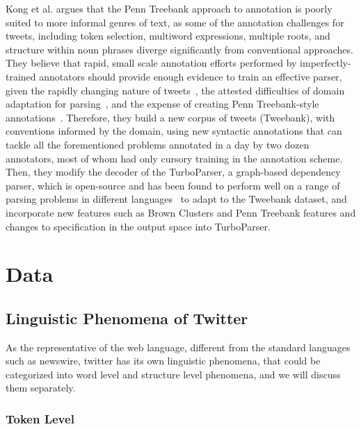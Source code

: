 \documentclass[11pt,letterpaper]{article}
\begin{document}
Kong et al.  argues that the Penn Treebank approach to annotation is poorly suited to more informal genres of text, as some of the annotation challenges for tweets,
including token selection, multiword expressions, multiple roots, and structure within noun phrases diverge significantly from conventional approaches. 
They believe that rapid, small scale annotation efforts performed by imperfectly-trained annotators should provide enough evidence to train an effective parser, given the rapidly changing nature of tweets~\cite{eisenstein:2013:NAACL-HLT}, the attested difficulties of domain adaptation for parsing~\cite{dred07}, and the expense of creating Penn Treebank-style annotations~\cite{penn93}. 
Therefore, they build a new corpus of tweets (Tweebank), with conventions informed by the domain, using new syntactic annotations that can tackle all the forementioned problems annotated in a day by two dozen annotators, most of whom had only cursory training in the annotation scheme. Then, they modify the decoder of the TurboParser, a graph-based dependency parser, which is open-source and has been found to perform well on a range of parsing problems in different languages~\cite{turbo13} to adapt to the Tweebank dataset, and incorporate new features such as Brown Clusters and Penn Treebank features and changes to specification
in the output space into TurboParser.




\section{Data}

\subsection{Linguistic Phenomena of Twitter}
As the representative of the web language, different from the standard languages such as newswire, twitter has its own linguistic phenomena, that could be categorized into word level and structure level phenomena, and we will discuss them separately.


\subsubsection{Token Level}
\end{document}
